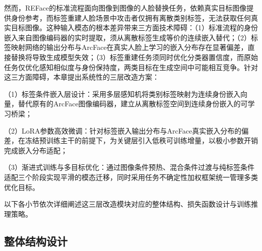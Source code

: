 然而，REFace的标准流程面向图像到图像的人脸替换任务，依赖真实目标图像提供身份参考，而标签重建人脸场景中攻击者仅拥有离散类别标签，无法获取任何真实目标图像。这种输入模态的根本差异带来三方面技术障碍：（1）标准流程的身份嵌入来自图像编码器的实时提取，须从离散标签生成等价的连续嵌入替代；（2）标签映射网络的输出分布与ArcFace在真实人脸上学习的嵌入分布存在显著偏差，直接替换将导致生成模型失效；（3）标签重建任务须同时优化分类器置信度，而原始任务仅优化感知相似度与身份保持度，两类目标在生成空间中可能相互竞争。针对这三方面障碍，本章提出系统性的三层改造方案：

（1）标签条件嵌入层设计：采用多层感知机将类别标签映射为连续身份嵌入向量，替代原有的ArcFace图像编码器，建立从离散标签空间到连续身份嵌入的可学习桥梁；

（2）LoRA参数高效微调：针对标签嵌入输出分布与ArcFace真实嵌入分布的偏差，在冻结预训练主干的前提下，为关键层引入低秩可训练增量，以极小参数开销完成嵌入分布适配；

（3）渐进式训练与多目标优化：通过图像条件预热、混合条件过渡与纯标签条件适配三个阶段实现平滑的模态迁移，同时采用任务不确定性加权框架统一管理多类优化目标。

以下各小节依次详细阐述这三层改造模块对应的整体结构、损失函数设计与训练推理策略。

\subsection{整体结构设计}


